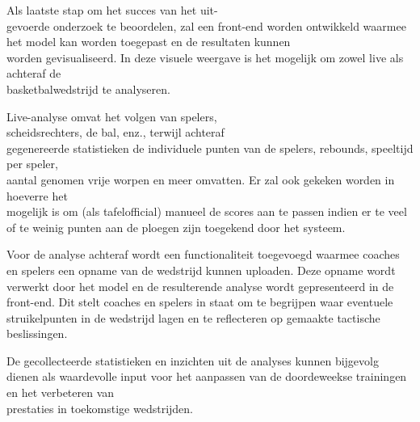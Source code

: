 Als laatste stap om het succes van het uit-\\gevoerde onderzoek te beoordelen, zal een front-end worden ontwikkeld waarmee het model kan worden toegepast en de resultaten kunnen \\worden gevisualiseerd. 
In deze visuele weergave is het mogelijk om zowel live als achteraf de \\basketbalwedstrijd te analyseren.


Live-analyse omvat het volgen van spelers, \\scheidsrechters, de bal, enz., terwijl achteraf \\gegenereerde statistieken de individuele punten van de spelers, rebounds, speeltijd per speler, \\aantal genomen vrije worpen en meer omvatten. Er zal ook gekeken worden in hoeverre het \\mogelijk is om (als tafelofficial) manueel de scores aan te passen indien er te veel of te weinig punten aan de ploegen zijn toegekend door het systeem.


Voor de analyse achteraf wordt een functionaliteit toegevoegd waarmee coaches en spelers een opname van de wedstrijd kunnen uploaden. Deze opname wordt verwerkt door het model en de resulterende analyse wordt gepresenteerd in de front-end. Dit stelt coaches en spelers in staat om te begrijpen waar eventuele struikelpunten in de wedstrijd lagen en te reflecteren op gemaakte tactische beslissingen. 

De gecollecteerde statistieken en inzichten uit de analyses kunnen bijgevolg dienen als waardevolle input voor het aanpassen van de doordeweekse trainingen en het verbeteren van \\prestaties in toekomstige wedstrijden.


